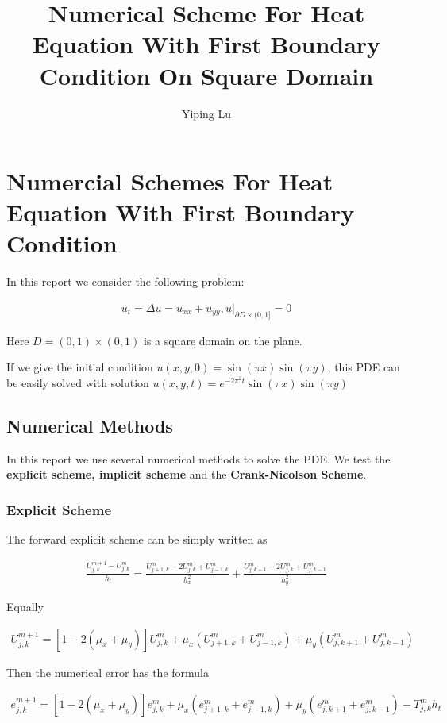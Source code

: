 \documentclass[12pt]{amsart}
\title{Numerical Scheme For Heat Equation With First Boundary Condition On Square Domain}
\author{Yiping Lu}
\date{} %
\begin{document}
\maketitle

\section{Numercial Schemes For Heat Equation With First Boundary Condition}

In this report we consider the following problem:

\begin{align*}
u_t=\Delta u = u_{xx}+u_{yy},u|_{\partial D \times(0,1]}=0
\end{align*}

Here $D=(0,1)\times(0,1)$ is a square domain on the plane.

If we give the initial condition $u(x,y,0)=\sin(\pi x)\sin(\pi y)$, this PDE can be easily solved with solution $u(x,y,t)=e^{-2\pi^2t}\sin(\pi x)\sin(\pi y)$


\subsection{Numerical Methods}


In this report we use several numerical methods to solve the PDE. We test the \textbf{explicit scheme, implicit scheme} and the \textbf{Crank-Nicolson Scheme}.

\subsubsection{Explicit Scheme} The forward explicit scheme can be simply written as

\begin{align*}
\frac{U_{j,k}^{m+1}-U_{j,k}^{m}}{h_t}=\frac{U_{j+1,k}^m-2U_{j,k}^m+U_{j-1,k}^m}{h_x^2} + \frac{U_{j,k+1}^m-2U_{j,k}^m+U_{j,k-1}^m}{h_y^2}
\end{align*}

Equally

\begin{align*}
U_{j,k}^{m+1} = [1-2(\mu_x+\mu_y)]U_{j,k}^m + \mu_x(U_{j+1,k}^m+U_{j-1,k}^m) + \mu_y(U_{j,k+1}^m+U_{j,k-1}^m)
\end{align*}

Then the numerical error has the formula

\begin{align*}
e_{j,k}^{m+1} = [1-2(\mu_x+\mu_y)]e_{j,k}^m +\mu_x(e_{j+1,k}^m+e_{j-1,k}^m)+ \mu_y(e_{j,k+1}^m+e_{j,k-1}^m) - T_{j,k}^m h_t
\end{align*}
\end{document}
